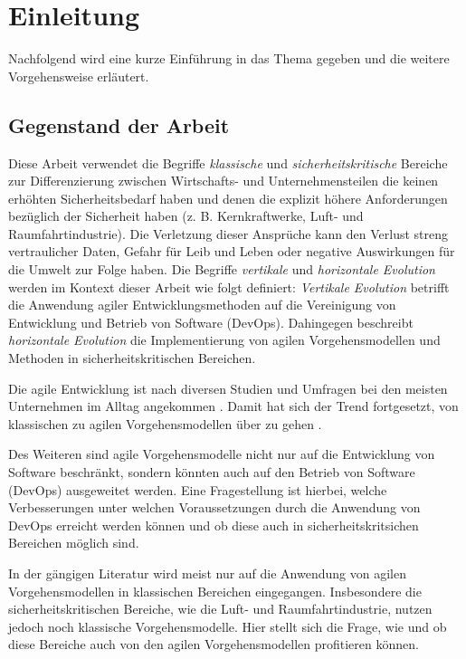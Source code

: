 \chapter{Einleitung} %

Nachfolgend wird eine kurze Einführung in das Thema gegeben und die weitere Vorgehensweise erläutert.

\section{Gegenstand der Arbeit}

Diese Arbeit verwendet die Begriffe \emph{klassische} und \emph{sicherheitskritische} Bereiche zur Differenzierung zwischen Wirtschafts- und Unternehmensteilen die keinen erhöhten Sicherheitsbedarf haben und denen die explizit höhere Anforderungen bezüglich der Sicherheit haben (z. B. Kernkraftwerke, Luft- und Raumfahrtindustrie).
Die Verletzung dieser Ansprüche kann den Verlust streng vertraulicher Daten, Gefahr für Leib und Leben oder negative Auswirkungen für die Umwelt zur Folge haben.
Die Begriffe \emph{vertikale} und \emph{horizontale Evolution} werden im Kontext dieser Arbeit wie folgt definiert:
\emph{Vertikale Evolution} betrifft die Anwendung agiler Entwicklungsmethoden auf die Vereinigung von Entwicklung und Betrieb von Software (DevOps).
Dahingegen beschreibt \emph{horizontale Evolution} die Implementierung von agilen Vorgehensmodellen und Methoden in sicherheitskritischen Bereichen.

Die agile Entwicklung ist nach diversen Studien und Umfragen bei den meisten Unternehmen im Alltag angekommen \parencite[vgl.][]{VersionOne:2015aa, HP:2015aa}. 
Damit hat sich der Trend fortgesetzt, von klassischen zu agilen Vorgehensmodellen über zu gehen \parencite[vgl.][]{Rodriguez:2012:SAL:2372251.2372275}.

Des Weiteren sind agile Vorgehensmodelle nicht nur auf die Entwicklung von Software beschränkt, sondern könnten auch auf den Betrieb von Software (DevOps) ausgeweitet werden.
Eine Fragestellung ist hierbei, welche Verbesserungen unter welchen Voraussetzungen durch die Anwendung von DevOps erreicht werden können und ob diese auch in sicherheitskritsichen Bereichen möglich sind.

In der gängigen Literatur wird meist nur auf die Anwendung von agilen Vorgehensmodellen in klassischen Bereichen eingegangen.
Insbesondere die sicherheitskritischen Bereiche, wie die Luft- und Raumfahrtindustrie, nutzen jedoch noch klassische Vorgehensmodelle.
Hier stellt sich die Frage, wie und ob diese Bereiche auch von den agilen Vorgehensmodellen profitieren können.

